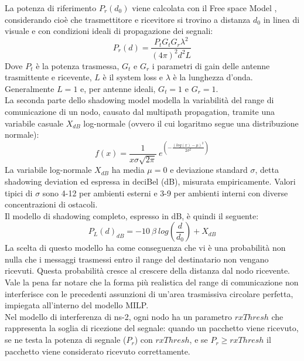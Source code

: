 La potenza di riferimento $P_r(d_0)$ viene calcolata con il Free space Model \cite{1697062}, considerando cioè che trasmettitore e ricevitore si trovino a distanza $d_0$ in linea di visuale e con condizioni ideali di propagazione dei segnali:
%
\begin{equation*} \label{eq:friis}
	 P_r(d) = \frac{ P_t G_t G_r \lambda^2 }{ (4\pi)^2d^2L } 
\end{equation*} 
% 
Dove $P_t$ è la potenza trasmessa, $G_t$ e $G_r$ i parametri di gain delle antenne trasmittente e ricevente, $L$ è il system loss e $\lambda$ è la lunghezza d'onda. Generalmente $L = 1$ e, per antenne ideali, $G_t = 1$ e $G_r = 1$.\\
La seconda parte dello shadowing model modella la variabilità del range di comunicazione di un nodo, causato dal multipath propagation, tramite una variabile casuale $X_{dB}$ log-normale (ovvero il cui logaritmo segue una distribuzione normale):
%
\begin{equation*} \label{eq:lognormal}
	f(x) = \frac{1}{x \sigma \sqrt{2 \pi}}\ e^{\left(- \frac{(log(x)- \mu)^2}{2 \sigma^2}\right)}
\end{equation*} 
% 
La variabile log-normale $X_{dB}$ ha media $\mu = 0$ e deviazione standard $\sigma$, detta shadowing deviation ed espressa in deciBel (dB), misurata empiricamente. Valori tipici di $\sigma$ sono 4-12 per ambienti esterni e 3-9 per ambienti interni con diverse concentrazioni di ostacoli.\\
Il modello di shadowing completo, espresso in dB, è quindi il seguente:
%
\begin{equation*} \label{eq:shadowing}
	P_L(d)_{dB} = - 10\ \beta\ log(\frac{d}{d_0}) + X_{dB}
\end{equation*} 
%
La scelta di questo modello ha come conseguenza che vi è una probabilità non nulla che i messaggi trasmessi entro il range del destinatario non vengano ricevuti. Questa probabilità cresce al crescere della distanza dal nodo ricevente. \\
Vale la pena far notare che la forma più realistica del range di comunicazione non interferisce con le precedenti assunzioni di un'area trasmissiva circolare perfetta, impiegata all'interno del modello MILP.\\
Nel modello di interferenza di ns-2, ogni nodo ha un parametro $rxThresh$ che rappresenta la soglia di ricezione del segnale: quando un pacchetto viene ricevuto, se ne testa la potenza di segnale ($P_r$) con $rxThresh$, e se $ P_r \geq rxThresh$ il pacchetto viene considerato ricevuto correttamente. \\
